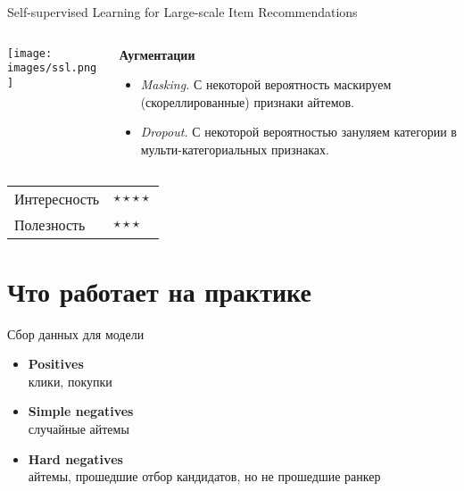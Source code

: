 \documentclass[11pt,aspectratio=169,handout]{beamer}
\begin{document}
\begin{frame}{Self-supervised Learning for Large-scale Item Recommendations \cite{SSL}}

\begin{columns}

\begin{column}{0.45\textwidth} 
\begin{center}
\texttt{[image: images/ssl.png]}
\end{center}
\end{column}

\begin{column}{0.45\textwidth}

\begin{small}
{\bf Аугментации}
\begin{itemize}
\item {\it Masking.} С некоторой вероятность маскируем (скореллированные) признаки айтемов.
\item {\it Dropout.} С некоторой вероятностью зануляем категории в мульти-категориальных признаках.
\end{itemize}
\end{small}

\end{column}
\end{columns}

\vfill

\begin{tabular}{l l}
Интересность & $\star\star\star\star$ \\
Полезность & $\star\star\star$
\end{tabular}

\end{frame}

\section{Что работает на практике}

\begin{frame}{Сбор данных для модели \cite{METH}}

\begin{itemize}
\item {\bf Positives} \\ клики, покупки
\item {\bf Simple negatives} \\ случайные айтемы
\item {\bf Hard negatives} \\ айтемы, прошедшие отбор кандидатов, но не прошедшие ранкер
\end{itemize}

\end{frame}
\end{document}
